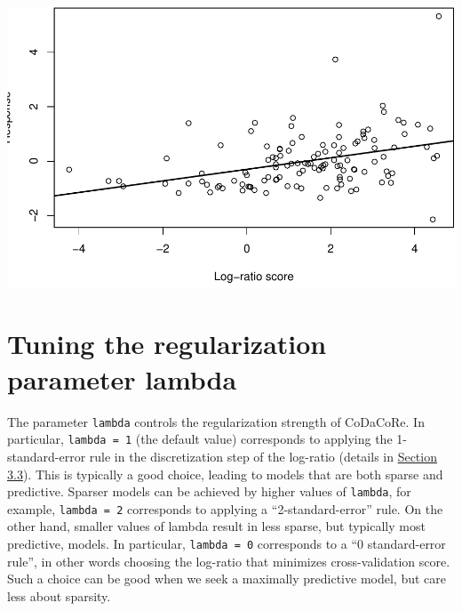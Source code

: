 \documentclass[
]{article}
\begin{document}
\includegraphics{guide_files/figure-latex/unnamed-chunk-17-1.pdf}

\hypertarget{tuning-the-regularization-parameter-lambda}{%
\section{Tuning the regularization parameter
lambda}\label{tuning-the-regularization-parameter-lambda}}

The parameter \texttt{lambda} controls the regularization strength of
CoDaCoRe. In particular, \texttt{lambda\ =\ 1} (the default value)
corresponds to applying the 1-standard-error rule in the discretization
step of the log-ratio (details in
\href{https://www.biorxiv.org/content/10.1101/2021.02.11.430695v2.full.pdf}{Section
3.3}). This is typically a good choice, leading to models that are both
sparse and predictive. Sparser models can be achieved by higher values
of \texttt{lambda}, for example, \texttt{lambda\ =\ 2} corresponds to
applying a ``2-standard-error'' rule. On the other hand, smaller values
of lambda result in less sparse, but typically most predictive, models.
In particular, \texttt{lambda\ =\ 0} corresponds to a ``0 standard-error
rule'', in other words choosing the log-ratio that minimizes
cross-validation score. Such a choice can be good when we seek a
maximally predictive model, but care less about sparsity.
\end{document}
